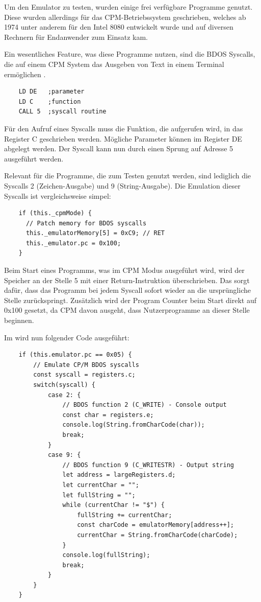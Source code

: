 Um den Emulator zu testen, wurden einige frei verfügbare Programme genutzt. Diese wurden allerdings für das \ac{CPM}-Betriebssystem geschrieben, welches ab 1974 unter anderem für den Intel 8080 entwickelt wurde und auf diversen Rechnern für Endanwender zum Einsatz kam.

Ein wesentliches Feature, was diese Programme nutzen, sind die \ac{BDOS} Syscalls, die auf einem \ac{CPM} System das Ausgeben von Text in einem Terminal ermöglichen \cite{cpmSyscalls}.

\begin{verbatim}
    LD DE   ;parameter
    LD C    ;function
    CALL 5  ;syscall routine
\end{verbatim}

Für den Aufruf eines Syscalls muss die Funktion, die aufgerufen wird, in das Register C geschrieben werden. Mögliche Parameter können im Register DE abgelegt werden. Der Syscall kann nun durch einen Sprung auf Adresse 5 ausgeführt werden.

Relevant für die Programme, die zum Testen genutzt werden, sind lediglich die Syscalls 2 (Zeichen-Ausgabe) und 9 (String-Ausgabe). Die Emulation dieser Syscalls ist vergleichsweise simpel:

\begin{verbatim}
    if (this._cpmMode) {
      // Patch memory for BDOS syscalls
      this._emulatorMemory[5] = 0xC9; // RET
      this._emulator.pc = 0x100;
    }
\end{verbatim}

Beim Start eines Programms, was im \ac{CPM} Modus ausgeführt wird, wird der Speicher an der Stelle 5 mit einer Return-Instruktion überschrieben. Das sorgt dafür, dass das Programm bei jedem Syscall sofort wieder an die ursprüngliche Stelle zurückspringt. Zusätzlich wird der Program Counter beim Start direkt auf 0x100 gesetzt, da \ac{CPM} davon ausgeht, dass Nutzerprogramme an dieser Stelle beginnen.

Im  wird nun folgender Code ausgeführt:

\begin{verbatim}
    if (this.emulator.pc == 0x05) {
        // Emulate CP/M BDOS syscalls
        const syscall = registers.c;
        switch(syscall) {
            case 2: {
                // BDOS function 2 (C_WRITE) - Console output
                const char = registers.e;
                console.log(String.fromCharCode(char));
                break;
            }
            case 9: {
                // BDOS function 9 (C_WRITESTR) - Output string
                let address = largeRegisters.d;
                let currentChar = "";
                let fullString = "";
                while (currentChar != "$") {
                    fullString += currentChar;
                    const charCode = emulatorMemory[address++];
                    currentChar = String.fromCharCode(charCode);
                }
                console.log(fullString);
                break;
            }
        }
    }
\end{verbatim}

